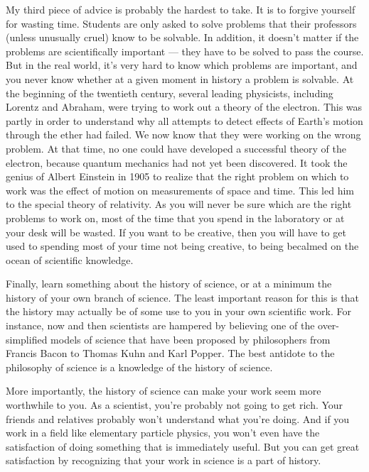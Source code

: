 My third piece of advice is probably the hardest to take. It is to forgive yourself for wasting time. Students are only asked to solve problems that their professors (unless unusually cruel) know to be solvable. In addition, it doesn't matter if the problems are scientifically important — they have to be solved to pass the course. But in the real world, it's very hard to know which problems are important, and you never know whether at a given moment in history a problem is solvable. At the beginning of the twentieth century, several leading physicists, including Lorentz and Abraham, were trying to work out a theory of the electron. This was partly in order to understand why all attempts to detect effects of Earth's motion through the ether had failed. We now know that they were working on the wrong problem. At that time, no one could have developed a successful theory of the electron, because quantum mechanics had not yet been discovered. It took the genius of Albert Einstein in 1905 to realize that the right problem on which to work was the effect of motion on measurements of space and time. This led him to the special theory of relativity. As you will never be sure which are the right problems to work on, most of the time that you spend in the laboratory or at your desk will be wasted. If you want to be creative, then you will have to get used to spending most of your time not being creative, to being becalmed on the ocean of scientific knowledge.

Finally, learn something about the history of science, or at a minimum the history of your own branch of science. The least important reason for this is that the history may actually be of some use to you in your own scientific work. For instance, now and then scientists are hampered by believing one of the over-simplified models of science that have been proposed by philosophers from Francis Bacon to Thomas Kuhn and Karl Popper. The best antidote to the philosophy of science is a knowledge of the history of science.

More importantly, the history of science can make your work seem more worthwhile to you. As a scientist, you're probably not going to get rich. Your friends and relatives probably won't understand what you're doing. And if you work in a field like elementary particle physics, you won't even have the satisfaction of doing something that is immediately useful. But you can get great satisfaction by recognizing that your work in science is a part of history.

